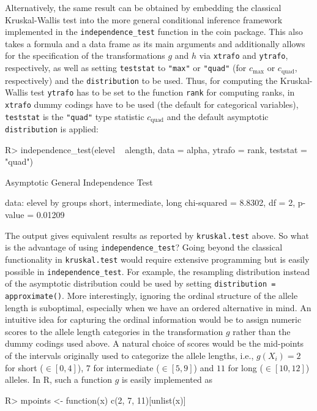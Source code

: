 \documentclass{article}
\newcommand{\Rpackage}[1]{{\normalfont\fontseries{b}\selectfont #1}}
\newcommand{\Rcmd}[1]{\texttt{#1}}
\newcommand{\RR}{\textsf{R}}
\newenvironment{Schunk}{}{}
\begin{document}
Alternatively, the same result can be obtained by embedding the classical Kruskal-Wallis
test into the more general conditional inference framework implemented in the
\Rcmd{independence\_test} function in the \Rpackage{coin} package. This also takes
a formula and a data frame as its main arguments and additionally allows for the
specification of the transformations $g$ and $h$ via 
\Rcmd{xtrafo} and \Rcmd{ytrafo}, respectively, as well as setting \Rcmd{teststat}
to \Rcmd{"max"} or \Rcmd{"quad"} (for $c_\text{max}$ or $c_\text{quad}$, respectively)
and the \Rcmd{distribution} to be used. Thus, for computing the Kruskal-Wallis test
\Rcmd{ytrafo} has to be set to the function \Rcmd{rank} for computing ranks, in \Rcmd{xtrafo}
dummy codings have to be used (the default for categorical variables), \Rcmd{teststat}
is the \Rcmd{"quad"} type statistic $c_\text{quad}$ and the default asymptotic
\Rcmd{distribution} is applied:
\begin{Schunk}
\begin{Sinput}
R> independence_test(elevel ~ alength, data = alpha, 
       ytrafo = rank, teststat = "quad")
\end{Sinput}
\begin{Soutput}
	Asymptotic General Independence Test

data:  elevel by
	 groups short, intermediate, long 
chi-squared = 8.8302, df = 2, p-value =
0.01209
\end{Soutput}
\end{Schunk}
The output gives equivalent results as reported by \Rcmd{kruskal.test} above.
So what is the advantage of using \Rcmd{independence\_test}?
Going beyond the classical functionality in \Rcmd{kruskal.test}
would require extensive programming but is easily possible in
\Rcmd{independence\_test}. For example, the resampling distribution instead of
the asymptotic distribution could be used by setting \Rcmd{distribution = approximate()}.
More interestingly, ignoring the ordinal structure of the allele length is
suboptimal, especially when we have an ordered alternative in mind. 
An intuitive idea for capturing the ordinal information would be to
assign numeric scores to the allele length categories in the transformation
$g$ rather than the dummy codings used above. A natural 
choice of scores would be the mid-points of the intervals originally 
used to categorize the allele lengths, i.e., $g(X_i) = 2$ for short
($\in [0, 4]$), $7$ for intermediate ($\in [5, 9]$) and $11$ for
long ($\in [10, 12]$) alleles. In \RR{}, such a function $g$ is easily
implemented as
\begin{Schunk}
\begin{Sinput}
R> mpoints <- function(x) c(2, 7, 11)[unlist(x)]
\end{Sinput}
\end{Schunk}
\end{document}
